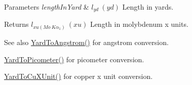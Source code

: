 \begin{DoxyParams}{Parameters}
{\em length\+In\+Yard} & $ l_{yd}\ (yd)$ Length in yards. \\
\hline
\end{DoxyParams}
\begin{DoxyReturn}{Returns}
$ l_{xu(Mo\ K\alpha_1)}\ (xu)$ Length in molybdenum x units. 
\end{DoxyReturn}
\begin{DoxySeeAlso}{See also}
\mbox{\hyperlink{group___e_g_x_math-_conversions-_length_conversions-_imperial-_yard-_non-_s_i_gaacff083bdc6b954da2e4b63f857cb429}{Yard\+To\+Angstrom()}} for angstrom conversion. 

\mbox{\hyperlink{group___e_g_x_math-_conversions-_length_conversions-_imperial-_yard-_s_i_ga1d0bc498fe3ed1693555aa6917abb758}{Yard\+To\+Picometer()}} for picometer conversion. 

\mbox{\hyperlink{group___e_g_x_math-_conversions-_length_conversions-_imperial-_yard-_non-_s_i_gabf4916569d4002f5c0ec8bbef8207980}{Yard\+To\+Cu\+X\+Unit()}} for copper x unit conversion. 
\end{DoxySeeAlso}
